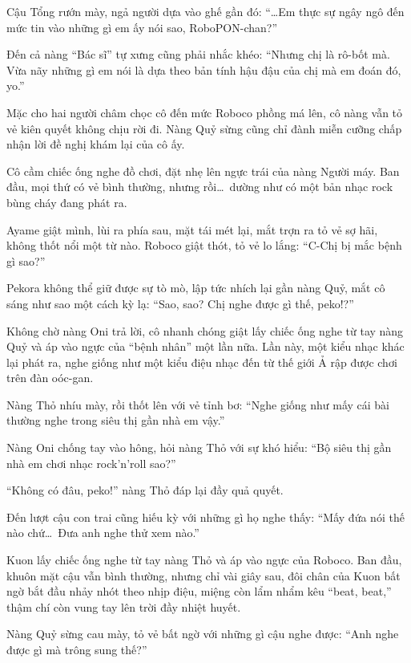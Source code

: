 \documentclass[../main.tex]{subfiles}
\begin{document}
Cậu Tổng rướn mày, ngả người dựa vào ghế gần đó: ``\dots Em thực sự ngây ngô đến mức tin vào những gì em ấy nói sao, RoboPON-chan?''

Đến cả nàng ``Bác sĩ'' tự xưng cũng phải nhắc khéo: ``Nhưng chị là rô-bốt mà. Vừa nãy những gì em nói là dựa theo bản tính hậu đậu của chị mà em đoán đó, yo.''

Mặc cho hai người châm chọc cô đến mức Roboco phồng má lên, cô nàng vẫn tỏ vẻ kiên quyết không chịu rời đi. Nàng Quỷ sừng cũng chỉ đành miễn cưỡng chấp nhận lời đề nghị khám lại của cô ấy.

Cô cầm chiếc ống nghe đồ chơi, đặt nhẹ lên ngực trái của nàng Người máy. Ban đầu, mọi thứ có vẻ bình thường, nhưng rồi\dots\ dường như có một bản nhạc rock bùng cháy đang phát ra.


Ayame giật mình, lùi ra phía sau, mặt tái mét lại, mắt trợn ra tỏ vẻ sợ hãi, không thốt nổi một từ nào. Roboco giật thót, tỏ vẻ lo lắng: ``C-Chị bị mắc bệnh gì sao?''

Pekora không thể giữ được sự tò mò, lập tức nhích lại gần nàng Quỷ, mắt cô sáng như sao một cách kỳ lạ: ``Sao, sao? Chị nghe được gì thế, peko!?''

Không chờ nàng Oni trả lời, cô nhanh chóng giật lấy chiếc ống nghe từ tay nàng Quỷ và áp vào ngực của ``bệnh nhân'' một lần nữa. Lần này, một kiểu nhạc khác lại phát ra, nghe giống như một kiểu điệu nhạc đến từ thế giới Ả rập được chơi trên đàn oóc-gan.

Nàng Thỏ nhíu mày, rồi thốt lên với vẻ tỉnh bơ: ``Nghe giống như mấy cái bài thường nghe trong siêu thị gần nhà em vậy.''


Nàng Oni chống tay vào hông, hỏi nàng Thỏ với sự khó hiểu: ``Bộ siêu thị gần nhà em chơi nhạc rock'n'roll sao?''

``Không có đâu, peko!'' nàng Thỏ đáp lại đầy quả quyết.

Đến lượt cậu con trai cũng hiếu kỳ với những gì họ nghe thấy: ``Mấy đứa nói thế nào chứ\dots\ Đưa anh nghe thử xem nào.''

Kuon lấy chiếc ống nghe từ tay nàng Thỏ và áp vào ngực của Roboco. Ban đầu, khuôn mặt cậu vẫn bình thường, nhưng chỉ vài giây sau, đôi chân của Kuon bất ngờ bắt đầu nhảy nhót theo nhịp điệu, miệng còn lẩm nhẩm kêu ``beat, beat,'' thậm chí còn vung tay lên trời đầy nhiệt huyết.

Nàng Quỷ sừng cau mày, tỏ vẻ bất ngờ với những gì cậu nghe được: ``Anh nghe được gì mà trông sung thế?''
\end{document}
